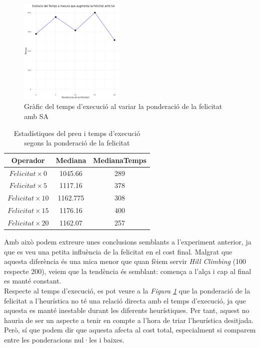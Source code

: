 \documentclass[a4paper]{article}
\begin{document}
	\begin{figure}[H]
		\centering
		\includegraphics[width=0.45\textwidth]{images/exp7b_grafic.png}
		\caption{Gràfic del temps d'execució al variar la ponderació de la felicitat amb SA}
		\label{fig:exp7b_grafic}
	\end{figure}
	
	\begin{table}[H]
		\centering
		\begin{tabular}{|c|c|c|}
			\hline
			\textbf{Operador} & \textbf{Mediana} & \textbf{MedianaTemps} \\
			\hline
			$Felicitat \times 0$ & 1045.66 & 289\\
			\hline
			$Felicitat \times 5$ & 1117.16 & 378\\
			\hline
			$Felicitat \times 10$ & 1162.775 & 308\\
			\hline
			$Felicitat \times 15$ & 1176.16 & 400\\
			\hline
			$Felicitat \times 20$ & 1162.07 & 257\\
			\hline
		\end{tabular}
		\caption{Estadístiques del preu i temps d'execució segons la ponderació de la felicitat}
		\label{tab:exp7_estadisticas}
	\end{table}
	
	Amb això podem extreure unes conclusions semblants a l'experiment anterior, ja que es veu una petita influència de la felicitat en el cost final. Malgrat que aquesta diferència és una mica menor que quan fèiem servir \textit{Hill Climbing} (100 respecte 200), veiem que la tendència és semblant: comença a l'alça i cap al final es manté constant. \\
	
	Respecte al temps d'execució, es pot veure a la \textit{Figura \ref{fig:exp7b_grafic}} que la ponderació de la felicitat a l'heurística no té una relació directa amb el temps d'execució, ja que aquesta es manté inestable durant les diferents heurístiques. Per tant, aquest no hauria de ser un aspecte a tenir en compte a l'hora de triar l'heurística desitjada. Però, sí que podem dir que aquesta afecta al cost total, especialment si comparem entre les ponderacions nul·les i baixes. \\
	
\end{document}

